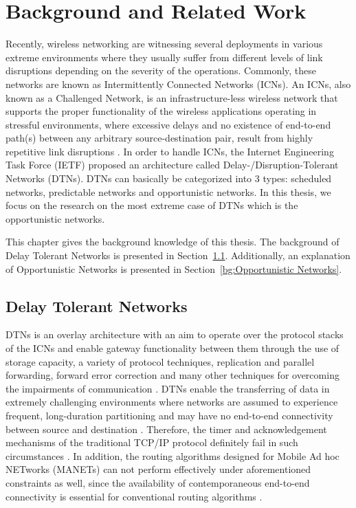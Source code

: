 \chapter{Background and Related Work}
\label{bg}


Recently, wireless networking are witnessing several deployments in various extreme environments where they usually suffer from different levels of link disruptions depending on the severity of the operations. 
Commonly, these networks are known as Intermittently Connected Networks (ICNs). 
An ICNs, also known as a Challenged Network, is an infrastructure-less wireless network that supports the proper functionality of the wireless applications operating in stressful environments, where excessive delays and no existence of end-to-end path(s) between any arbitrary source-destination pair, result from highly repetitive link disruptions \cite{Khabbaz2012}.
In order to handle ICNs, the Internet Engineering Task Force (IETF) \cite{Cerf2007} proposed an architecture called Delay-/Disruption-Tolerant Networks (DTNs).
DTNs can basically be categorized into 3 types: scheduled networks, predictable networks and opportunistic networks.
In this thesis, we focus on the research on the most extreme case of DTNs which is the opportunistic networks.

This chapter gives the background knowledge of this thesis. 
The background of Delay Tolerant Networks is presented in Section~\ref{bg:Delay Tolerant Networks}. 
Additionally, an explanation of Opportunistic Networks is presented in Section~\ref{bg:Opportunistic Networks}. 
\section{Delay Tolerant Networks}
\label{bg:Delay Tolerant Networks}
DTNs is an overlay architecture with an aim to operate over the protocol stacks of the ICNs and enable gateway functionality between them through the use of storage capacity, a variety of protocol techniques, replication and parallel forwarding, forward error correction and many other techniques for overcoming the impairments of communication  \cite{Khabbaz2012}.
DTNs enable the transferring of data in extremely challenging environments where networks are assumed to experience frequent, long-duration partitioning and may have no end-to-end connectivity between source and destination \cite{Liu2011}. 
Therefore, the timer and acknowledgement mechanisms of the traditional TCP/IP protocol definitely fail in such circumstances \cite{Souza2010}.
In addition, the routing algorithms designed for Mobile Ad hoc NETworks (MANETs) can not perform effectively under aforementioned constraints as well, since the availability of contemporaneous end-to-end connectivity is essential for conventional routing algorithms \cite{Yue2013}.

